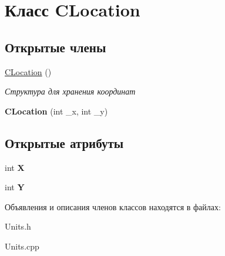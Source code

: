 \hypertarget{classCLocation}{}\section{Класс C\+Location}
\label{classCLocation}
\subsection*{Открытые члены}
\begin{DoxyCompactItemize}
\item 
\hyperlink{classCLocation_aafc1a7fd97be7876236e990a433d761f}{C\+Location} ()\hypertarget{classCLocation_aafc1a7fd97be7876236e990a433d761f}{}\label{classCLocation_aafc1a7fd97be7876236e990a433d761f}

\begin{DoxyCompactList}\small\item\em Структура для хранения координат \end{DoxyCompactList}\item 
{\bfseries C\+Location} (int \+\_\+x, int \+\_\+y)\hypertarget{classCLocation_a24fe35e708f07fd0ca1d1664e7ac34b3}{}\label{classCLocation_a24fe35e708f07fd0ca1d1664e7ac34b3}

\end{DoxyCompactItemize}
\subsection*{Открытые атрибуты}
\begin{DoxyCompactItemize}
\item 
int {\bfseries X}\hypertarget{classCLocation_a6aeac29e7ba40cb925553b4dd22ae507}{}\label{classCLocation_a6aeac29e7ba40cb925553b4dd22ae507}

\item 
int {\bfseries Y}\hypertarget{classCLocation_a95c7eebe8d797ab01dc22f7268fb89fe}{}\label{classCLocation_a95c7eebe8d797ab01dc22f7268fb89fe}

\end{DoxyCompactItemize}


Объявления и описания членов классов находятся в файлах\+:\begin{DoxyCompactItemize}
\item 
Units.\+h\item 
Units.\+cpp\end{DoxyCompactItemize}
